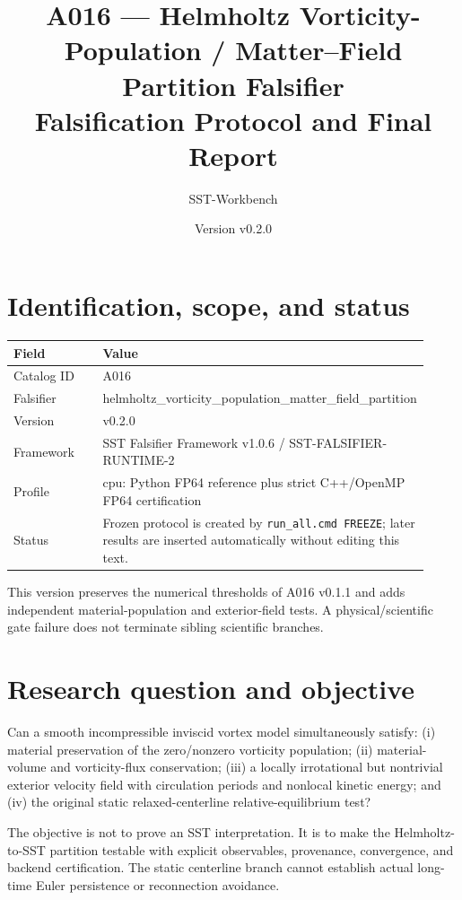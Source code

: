 \documentclass[11pt,a4paper]{article}
\title{A016 --- Helmholtz Vorticity-Population / Matter--Field Partition Falsifier\\Falsification Protocol and Final Report}
\author{SST-Workbench}
\date{Version v0.2.0}
\begin{document}
\maketitle

\section{Identification, scope, and status}
\begin{longtable}{p{0.30\linewidth}p{0.62\linewidth}}
\toprule
Field & Value \\
\midrule
Catalog ID & A016 \\
Falsifier & helmholtz\_vorticity\_population\_matter\_field\_partition \\
Version & v0.2.0 \\
Framework & SST Falsifier Framework v1.0.6 / SST-FALSIFIER-RUNTIME-2 \\
Profile & cpu: Python FP64 reference plus strict C++/OpenMP FP64 certification \\
Status & Frozen protocol is created by \texttt{run\_all.cmd FREEZE}; later results are inserted automatically without editing this text. \\
\bottomrule
\end{longtable}
This version preserves the numerical thresholds of A016 v0.1.1 and adds independent material-population and exterior-field tests. A physical/scientific gate failure does not terminate sibling scientific branches.

\section{Research question and objective}
Can a smooth incompressible inviscid vortex model simultaneously satisfy: (i) material preservation of the zero/nonzero vorticity population; (ii) material-volume and vorticity-flux conservation; (iii) a locally irrotational but nontrivial exterior velocity field with circulation periods and nonlocal kinetic energy; and (iv) the original static relaxed-centerline relative-equilibrium test?

The objective is not to prove an SST interpretation. It is to make the Helmholtz-to-SST partition testable with explicit observables, provenance, convergence, and backend certification. The static centerline branch cannot establish actual long-time Euler persistence or reconnection avoidance.

\end{document}
